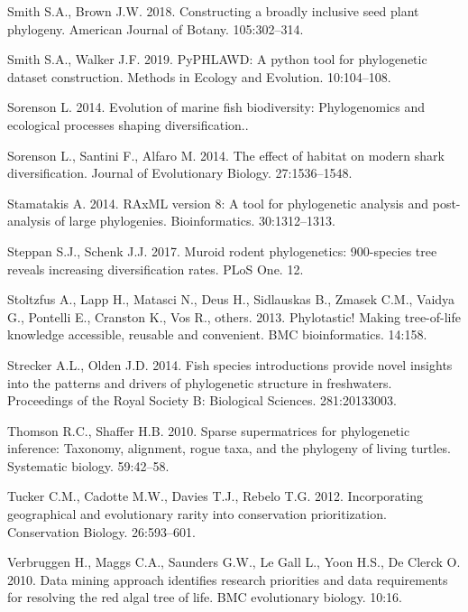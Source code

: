 \documentclass[]{article}
\begin{document}
\leavevmode\hypertarget{ref-smith2018constructing}{}%
Smith S.A., Brown J.W. 2018. Constructing a broadly inclusive seed plant phylogeny. American Journal of Botany. 105:302--314.

\leavevmode\hypertarget{ref-smith2019pyphlawd}{}%
Smith S.A., Walker J.F. 2019. PyPHLAWD: A python tool for phylogenetic dataset construction. Methods in Ecology and Evolution. 10:104--108.

\leavevmode\hypertarget{ref-sorenson2014evolution}{}%
Sorenson L. 2014. Evolution of marine fish biodiversity: Phylogenomics and ecological processes shaping diversification..

\leavevmode\hypertarget{ref-sorenson2014effect}{}%
Sorenson L., Santini F., Alfaro M. 2014. The effect of habitat on modern shark diversification. Journal of Evolutionary Biology. 27:1536--1548.

\leavevmode\hypertarget{ref-stamatakis2014raxml}{}%
Stamatakis A. 2014. RAxML version 8: A tool for phylogenetic analysis and post-analysis of large phylogenies. Bioinformatics. 30:1312--1313.

\leavevmode\hypertarget{ref-steppan2017muroid}{}%
Steppan S.J., Schenk J.J. 2017. Muroid rodent phylogenetics: 900-species tree reveals increasing diversification rates. PLoS One. 12.

\leavevmode\hypertarget{ref-stoltzfus2013phylotastic}{}%
Stoltzfus A., Lapp H., Matasci N., Deus H., Sidlauskas B., Zmasek C.M., Vaidya G., Pontelli E., Cranston K., Vos R., others. 2013. Phylotastic! Making tree-of-life knowledge accessible, reusable and convenient. BMC bioinformatics. 14:158.

\leavevmode\hypertarget{ref-strecker2014fish}{}%
Strecker A.L., Olden J.D. 2014. Fish species introductions provide novel insights into the patterns and drivers of phylogenetic structure in freshwaters. Proceedings of the Royal Society B: Biological Sciences. 281:20133003.

\leavevmode\hypertarget{ref-thomson2010sparse}{}%
Thomson R.C., Shaffer H.B. 2010. Sparse supermatrices for phylogenetic inference: Taxonomy, alignment, rogue taxa, and the phylogeny of living turtles. Systematic biology. 59:42--58.

\leavevmode\hypertarget{ref-tucker2012incorporating}{}%
Tucker C.M., Cadotte M.W., Davies T.J., Rebelo T.G. 2012. Incorporating geographical and evolutionary rarity into conservation prioritization. Conservation Biology. 26:593--601.

\leavevmode\hypertarget{ref-verbruggen2010data}{}%
Verbruggen H., Maggs C.A., Saunders G.W., Le Gall L., Yoon H.S., De Clerck O. 2010. Data mining approach identifies research priorities and data requirements for resolving the red algal tree of life. BMC evolutionary biology. 10:16.
\end{document}
